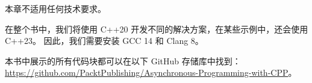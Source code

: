 本章不适用任何技术要求。

在整个书中，我们将使用 C++20 开发不同的解决方案，在某些示例中，还会使用 C++23。
因此，我们需要安装 GCC 14 和 Clang 8。

本书中展示的所有代码块都可以在以下 GitHub 存储库中找到： \url{https://github.com/PacktPublishing/Asynchronous-Programming-with-CPP}。